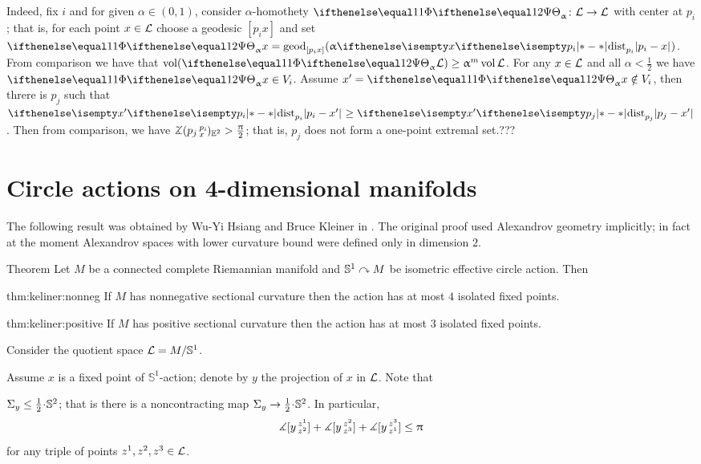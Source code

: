 Indeed, fix $i$ and for given $\alpha\in(0,1)$, consider $\alpha$-homothety $\map_\alpha\:\spc{L}\to \spc{L}$ with center at $p_i$; 
that is, for each point $x\in \spc{L}$ choose a geodesic $[p_ix]$ and set
$\map_\alpha x=\geod_{[p_ix]}(\alpha\dist{p_i}{x}{})$.
From comparison we have that $\vol(\map_\alpha \spc{L})\ge\alpha^m\vol \spc{L}$.
For any $x\in \spc{L}$ and all $\alpha<\tfrac{1}{2}$ we have $\map_\alpha x\in V_i$.
Assume $x'=\map_\alpha x\notin V_i$,
then threre is $p_j$ such that $\dist{p_i}{x'}{}\ge\dist{p_j}{x'}{}$.
Then from comparison, we have $\angk{p_j}{p_i}{x}_{\EE^2}>\tfrac\pi2$;
that is, $p_j$ does not form a one-point extremal set.???
\qeds

\section{Circle actions on 4-dimensional manifolds}



The following result was obtained by Wu-Yi Hsiang and Bruce Kleiner in \cite{hsiang-kleiner}.
The original proof used Alexandrov geometry implicitly;
in fact at the moment 
Alexandrov spaces with lower curvature bound were defined only in dimension $2$.

\begin{thm}{Theorem}\label{thm:keliner}
Let $M$ be a connected complete Riemannian manifold 
and $\mathbb{S}^1\curvearrowright M$ be isometric effective circle action.
Then
\begin{subthm}{thm:keliner:nonneg}
If $M$ has nonnegative sectional curvature then the action has at most $4$ isolated fixed points.
\end{subthm}

\begin{subthm}{thm:keliner:positive}
If $M$ has positive sectional curvature then the action has at most $3$ isolated fixed points.
\end{subthm}

\end{thm}

Consider the quotient space $\mathcal{L}=M/\mathbb{S}^1$.

Assume $x$ is a fixed point of $\mathbb{S}^1$-action;
denote by $y$ the projection of $x$ in $\mathcal{L}$.
Note that

\begin{clm}{}\label{clm:Sigma=<sphere/2}
$\Sigma_y\le \tfrac12\cdot\SS^2$;
that is there is a noncontracting map $\Sigma_y\to \tfrac12\cdot\SS^2$.
In particular, 
\[\mangle\hinge y{z^1}{z^2}+\mangle\hinge y{z^2}{z^3}+\mangle\hinge y{z^3}{z^1}\le\pi\]
for any triple of points $z^1,z^2,z^3\in\spc{L}$.
\end{clm}

